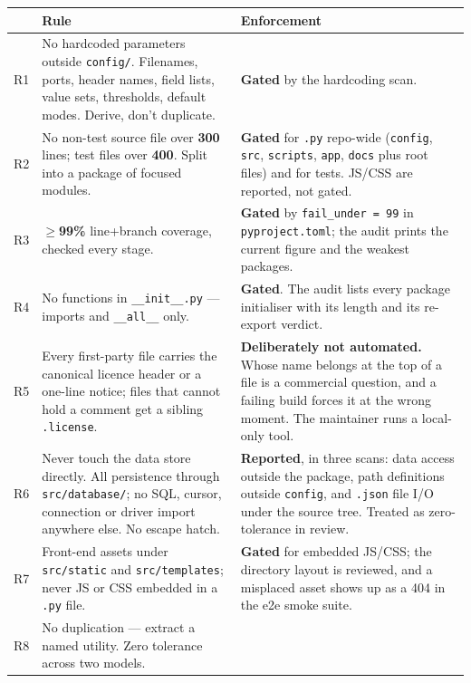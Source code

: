 \documentclass[11pt]{article}
\begin{document}
\begin{longtable}{@{}p{}p{}p{}@{}}
\toprule
& \textbf{Rule} & \textbf{Enforcement} \\
\midrule
\endhead
R1 & No hardcoded parameters outside \texttt{config/}. Filenames, ports, header names,
     field lists, value sets, thresholds, default modes. Derive, don't duplicate. &
     \textbf{Gated} by the hardcoding scan. \\
R2 & No non-test source file over \textbf{300} lines; test files over \textbf{400}.
     Split into a package of focused modules. &
     \textbf{Gated} for \texttt{.py} repo-wide (\texttt{config}, \texttt{src},
     \texttt{scripts}, \texttt{app}, \texttt{docs} plus root files) and for tests. JS/CSS
     are reported, not gated. \\
R3 & \(\geq\)\textbf{99\%} line+branch coverage, checked every stage. &
     \textbf{Gated} by \texttt{fail\_under = 99} in \texttt{pyproject.toml}; the audit
     prints the current figure and the weakest packages. \\
R4 & No functions in \texttt{\_\_init\_\_.py} --- imports and \texttt{\_\_all\_\_} only. &
     \textbf{Gated}. The audit lists every package initialiser with its length and its
     re-export verdict. \\
R5 & Every first-party file carries the canonical licence header or a one-line notice;
     files that cannot hold a comment get a sibling \texttt{.license}. &
     \textbf{Deliberately not automated.} Whose name belongs at the top of a file is a
     commercial question, and a failing build forces it at the wrong moment. The
     maintainer runs a local-only tool. \\
R6 & Never touch the data store directly. All persistence through
     \texttt{src/database/}; no SQL, cursor, connection or driver import anywhere else.
     No escape hatch. &
     \textbf{Reported}, in three scans: data access outside the package, path definitions
     outside \texttt{config}, and \texttt{.json} file I/O under the source tree. Treated as
     zero-tolerance in review. \\
R7 & Front-end assets under \texttt{src/static} and \texttt{src/templates}; never JS or
     CSS embedded in a \texttt{.py} file. &
     \textbf{Gated} for embedded JS/CSS; the directory layout is reviewed, and a misplaced
     asset shows up as a 404 in the e2e smoke suite. \\
R8 & No duplication --- extract a named utility. Zero tolerance across two models. &

\end{longtable}
\end{document}

